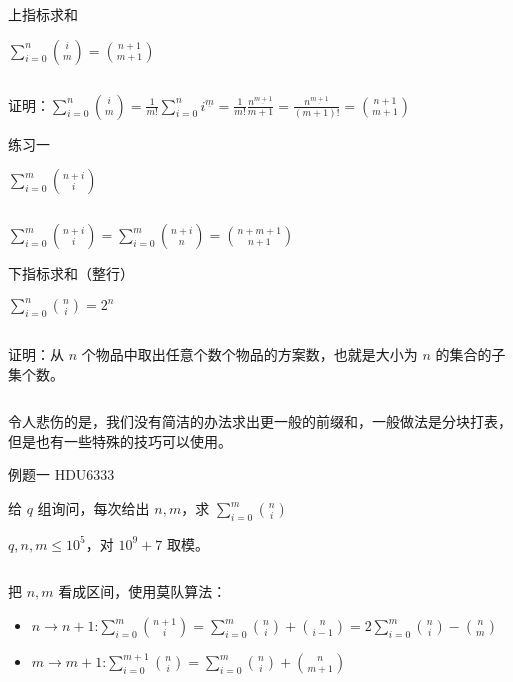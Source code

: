 \documentclass{beamer}
\begin{document}
\begin{frame}{上指标求和}

    $\sum\limits_{i = 0} ^n {\binom i m} = \binom {n + 1} {m + 1}$

    $ $
    \pause

    证明：$\sum\limits_{i = 0} ^n {\binom i m} = \frac 1 {m!} \sum\limits_{i = 0} ^n {i ^{\underline m}} = \frac 1 {m!} \frac {n^{\underline{m + 1}}}{m + 1} = \frac {n^{\underline {m+1}}}{(m+1)!} = \binom {n + 1} {m + 1}$
    
\end{frame}

\begin{frame}{练习一}

    $\sum\limits_{i = 0} ^m {\binom {n + i}{i}}$

    $ $
    \pause

    $\sum\limits_{i = 0} ^m {\binom {n + i}i} = \sum\limits_{i = 0} ^m {\binom {n + i}n} =\binom {n + m + 1} {n + 1}$
    
\end{frame}

\begin{frame}{下指标求和（整行）}

    $\sum\limits_{i = 0} ^n {\binom n i} = 2 ^n$

    $ $
    \pause

    证明：从 $n$ 个物品中取出任意个数个物品的方案数，也就是大小为 $n$ 的集合的子集个数。

    $ $
    \pause

    令人悲伤的是，我们没有简洁的办法求出更一般的前缀和，一般做法是分块打表，但是也有一些特殊的技巧可以使用。
    
\end{frame}

\begin{frame}{例题一 HDU6333}
    
    给 $q$ 组询问，每次给出 $n,m$，求 $\sum\limits_{i=0}^m {\binom n i}$

    $q,n,m\leq 10^5$，对 $10^9 + 7$ 取模。

    $ $
    \pause

    把 $n,m$ 看成区间，使用莫队算法：
    \begin{itemize}
        \item $n \rightarrow n + 1$:$\sum\limits_{i=0}^m{\binom {n+1} i} = \sum\limits_{i=0}^m{\binom ni+\binom n {i - 1}} = 2\sum\limits_{i=0}^m \binom ni - \binom nm$
        \item $m \rightarrow m + 1$:$\sum\limits_{i=0}^{m+1}{\binom n i} = \sum\limits_{i=0}^m{\binom ni} + \binom n{m + 1}$
    \end{itemize}
    
\end{frame}
\end{document}
